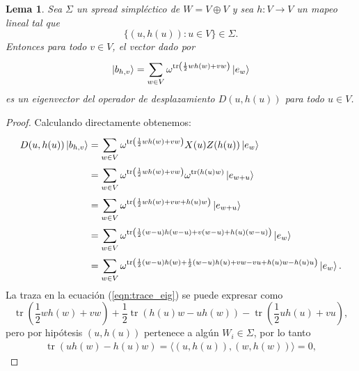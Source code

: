 \documentclass[a4paper]{report}
\DeclareMathOperator{\tr}{tr}
\newtheorem{lemma}{Lema}
\begin{document}
  \begin{lemma}
    \label{lemma:h_mubs}
    Sea $\Sigma$ un spread simpléctico de $W = V \oplus V$ y
    sea $h : V \to V$ un mapeo lineal tal que
    \begin{equation}
      \{(u,h(u)) : u \in V\} \in \Sigma.
    \end{equation}
    Entonces para todo $v \in V$, el vector dado por
    \begin{equation}
      \ket{b_{h,v}}
      = \sum_{w \in V}^{}
      \omega^{\tr\left(
          \frac{1}{2} w
        h(w) + v w
      \right) } \ket{e_w}
    \end{equation} 
    es un eigenvector del operador de desplazamiento
    $D(u,h(u))$ para todo $u \in V$.
  \end{lemma}
  \begin{proof}
    Calculando directamente obtenemos:
    \begin{align}
      D(u,h(u)) \ket{b_{h,v}}
      &= \sum_{w \in V}^{}
      \omega^{\tr\left(
          \frac{1}{2} w h(w) + v w
      \right) }
      X(u)Z(h(u)) \ket{e_w} \\
      &= \sum_{w \in V}^{}
      \omega^{\tr\left(
          \frac{1}{2} w h(w) + v w
      \right) }
      \omega^{\tr(h(u) w)}
      \ket{e_{w+u}} \\
      &= \sum_{w \in V}^{}
      \omega^{\tr\left(
          \frac{1}{2} w h(w) + v w + h(u) w
      \right) }
      \ket{e_{w+u}} \\
      &= \sum_{w \in V}^{}
      \omega^{\tr\left(
          \frac{1}{2} (w-u) h(w-u) + v (w-u) + h(u) (w-u)
      \right) }
      \ket{e_w} \\
      &= \sum_{w \in V}^{}
      \omega^{\tr\left(
        \frac{1}{2}(w-u) h(w) + \frac{1}{2}(w-u) h(u)
        + v w - v u + h(u) w - h(u) u
      \right) }
      \ket{e_w}.
      \label{eqn:trace_eig}
    \end{align}
    La traza en la ecuación (\ref{eqn:trace_eig}) se puede
    expresar como
    \begin{equation}
      \tr\left(
        \frac{1}{2} w h(w) + v w
      \right)
      + \frac{1}{2}\tr\left(
        h(u) w - u h(w)
      \right)
      - \tr\left(
        \frac{1}{2} u h(u) + v u
      \right),
    \end{equation}
    pero por hipótesis $(u,h(u))$ pertenece a algún $W_i \in
    \Sigma$, por lo tanto
    \begin{align}
      \tr\left( u h(w) - h(u) w \right)
      = \langle (u,h(u)), (w,h(w)) \rangle
      = 0,

\end{align}
\end{proof}
\end{document}
